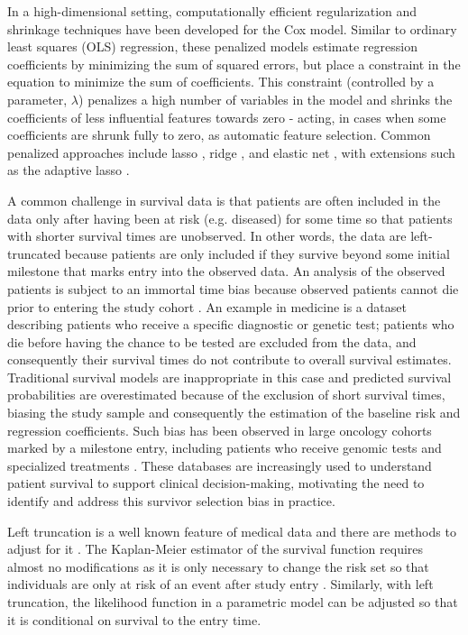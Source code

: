 \documentclass[11pt,final,fleqn]{article}\usepackage[]{graphicx}\usepackage[]{color}
\theoremstyle{plain}
\begin{document}
In a high-dimensional setting, computationally efficient regularization and shrinkage techniques have been developed \cite{tibshirani1997lasso, friedman2010regularization, simon2011regularization} for the Cox model. Similar to ordinary least squares (OLS) regression, these penalized models estimate regression coefficients by minimizing the sum of squared errors, but place a constraint in the equation to minimize the sum of coefficients. This constraint (controlled by a parameter, $\lambda$) penalizes a high number of variables in the model and shrinks the coefficients of less influential features towards zero - acting, in cases when some coefficients are shrunk fully to zero, as automatic feature selection. Common penalized approaches include lasso \cite{tibshirani1996regression}, ridge \cite{hoerl1970ridgeA, hoerl1970ridgeB}, and elastic net \cite{zou2005regularization}, with extensions such as the adaptive lasso \cite{zou2006adaptive}. 

A common challenge in survival data is that patients are often included in the data only after having been at risk (e.g. diseased) for some time so that patients with shorter survival times are unobserved. In other words, the data are left-truncated because patients are only included if they survive beyond some initial milestone that marks entry into the observed data. An analysis of the observed patients is subject to an immortal time bias because observed patients cannot die prior to entering the study cohort \cite{levesque2010problem, giobbie2013challenges}. An example in medicine is a dataset describing patients who receive a specific diagnostic or genetic test; patients who die before having the chance to be tested are excluded from the data, and consequently their survival times do not contribute to overall survival estimates. Traditional survival models are inappropriate in this case and predicted survival probabilities are overestimated because of the exclusion of short survival times, biasing the study sample and consequently the estimation of the baseline risk and regression coefficients. Such bias has been observed in large oncology cohorts marked by a milestone entry, including patients who receive genomic tests \cite{kehl2020selectionbias} and specialized treatments \cite{newman2020immortaltime}. These databases are increasingly used to understand patient survival to support clinical decision-making, motivating the need to identify and address this survivor selection bias in practice. 

Left truncation is a well known feature of medical data and there are methods to adjust for it \cite{kalbfleisch2011statistical}. The Kaplan-Meier estimator of the survival function requires almost no modifications as it is only necessary to change the risk set so that individuals are only at risk of an event after study entry \cite{tsai1987note}. Similarly, with left truncation, the likelihood function in a parametric model can be adjusted so that it is conditional on survival to the entry time.
\end{document}
